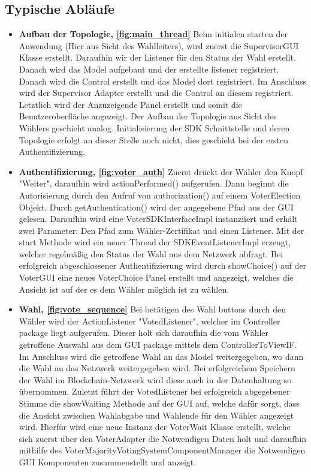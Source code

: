 \documentclass[parskip=full]{scrartcl}
\newcommand{\fakeparagraph}[1]{\textbf{#1}}
\begin{document}
	\subsection{Typische Abläufe}
	\begin{itemize}
	\item\fakeparagraph{Aufbau der Topologie, \autoref{fig:main_thread} } Beim initialen starten der Anwendung (Hier aus Sicht des Wahlleiters), wird zuerst die SupervisorGUI Klasse erstellt. Daraufhin wir der Listener für den Status der Wahl erstellt. Danach wird das Model aufgebaut und der erstellte listener registriert. Danach wird die Control erstellt und das Model dort registriert. Im Anschluss wird der Supervisor Adapter erstellt und die Control an diesem registriert. Letztlich wird der Anzuzeigende Panel erstellt und somit die Benutzeroberfläche angezeigt.
	Der Aufbau der Topologie aus Sicht des Wählers geschieht analog.
	Initialisierung der SDK Schnittstelle und deren Topologie erfolgt an dieser Stelle noch nicht, dies geschieht bei der ersten Authentifizierung.
	
		\item\fakeparagraph{Authentifizierung, \autoref{fig:voter_auth} } Zuerst drückt der Wähler den Knopf "Weiter", daraufhin wird actionPerformed() aufgerufen.
	Dann beginnt die Autorisierung durch den Aufruf von authorization() auf einem VoterElection Objekt.
	Durch getAuthentication() wird der angegebene Pfad aus der GUI gelesen.
	Daraufhin wird eine VoterSDKInterfaceImpl instanziiert und erhält zwei Parameter: Den Pfad zum Wähler-Zertifikat und einen Listener.
	Mit der start Methode wird ein neuer Thread der SDKEventListenerImpl erzeugt, welcher regelmäßig den Status der Wahl aus dem Netzwerk abfragt.
	Bei erfolgreich abgeschlossener Authentifizierung wird durch showChoice() auf der VoterGUI eine neues VoterChoice Panel erstellt und angezeigt, welches die Ansicht ist auf der es dem Wähler möglich ist zu wählen.
	
	\item\fakeparagraph{Wahl, \autoref{fig:vote_sequence} } Bei betätigen des Wahl buttons durch den Wähler wird der ActionListener "VotedListener", welcher im Controller package liegt aufgerufen. Dieser holt sich daraufhin die vom Wähler getroffene Auswahl aus dem GUI package mittels dem ControllerToViewIF. Im Anschluss wird die getroffene Wahl an das Model weitergegeben, wo dann die Wahl an das Netzwerk weitergegeben wird. Bei erfolgreichem Speichern der Wahl im Blockchain-Netzwerk wird diese auch in der Datenhaltung so übernommen. Zuletzt führt der VotedListener bei erfolgreich abgegebener Stimme die showWaiting Methode auf der GUI auf, welche dafür sorgt, dass die Ansicht zwischen Wahlabgabe und Wahlende für den Wähler angezeigt wird. Hierfür wird eine neue Instanz der VoterWait Klasse erstellt, welche sich zuerst über den VoterAdapter die Notwendigen Daten holt und daraufhin mithilfe des VoterMajorityVotingSystemComponentManager die Notwendigen GUI Komponenten zusammenstellt und anzeigt.
	
	\end{itemize}
\end{document}
